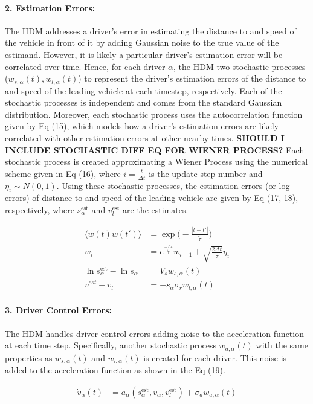 \documentclass[12pt]{article}
\begin{document}
\paragraph{2. Estimation Errors:}
The HDM addresses a driver's error in estimating the distance to and speed of the vehicle in front of it by adding Gaussian noise to the true value of the estimand.  However, it is likely a particular driver's estimation error will be correlated over time. Hence, for each driver $\alpha$, the HDM two stochastic processes ($w_{s,\alpha}(t),w_{l,\alpha}(t)$) to represent the driver's estimation errors of the distance to and speed of the leading vehicle at each timestep, respectively.  Each of the stochastic processes is independent and comes from the standard Gaussian distribution.  Moreover, each stochastic process uses the autocorrelation function given by Eq (15), which models how a driver's estimation errors are likely correlated with other estimation errors at other nearby times. \textbf{SHOULD I INCLUDE STOCHASTIC DIFF EQ FOR WIENER PROCESS?} Each stochastic process is created approximating a Wiener Process using the numerical scheme given in Eq (16), where $i=\frac{t}{\Delta t}$ is the update step number and $\eta_i \sim N(0,1)$.
Using these stochastic processes, the estimation errors (or log errors) of distance to and speed of the leading vehicle are given by Eq (17, 18), respectively, where $s_\alpha^\text{est}$ and $v_l^\text{est}$ are the estimates.
\begin{mymathbox}[ams gather, title=Estimation Error Equations,colframe=blue!30!black]
  \begin{align}
  \langle w(t)w(t')\rangle&  =\exp\bigg(-\frac{|t-t'|}{\tilde{\tau}}\bigg)\\
  w_i&=e^{\frac{-\Delta t}{\tilde{\tau}}}w_{i-1}+\sqrt{\frac{2\Delta t}{\tilde\tau}}\eta_i\\
  \ln s_\alpha^{\text{est}} - \ln s_\alpha &= V_s w_{s,\alpha}(t)\\
  v^{est} - v_l &= -s_\alpha \sigma_r w_{l,\alpha}(t)
  \end{align}
\end{mymathbox}
\paragraph{3. Driver Control Errors:}
The HDM handles driver control errors adding noise to the acceleration function at each time step.  Specifically, another stochastic process $w_{a,\alpha}(t)$ with the same properties as $w_{s,\alpha}(t)$ and  $w_{l,\alpha}(t)$ is created for each driver.  This noise is added to the acceleration function as shown in the Eq (19).
\begin{mymathbox}[ams gather, title=Driver Control Error Equation Equations,colframe=blue!30!black]
  \begin{align}
\dot v_\alpha(t)&=a_\alpha(s_\alpha^\text{est},v_\alpha,v_l^\text{est})+\sigma_a w_{a,\alpha}(t)
  \end{align}
\end{mymathbox}
\end{document}
